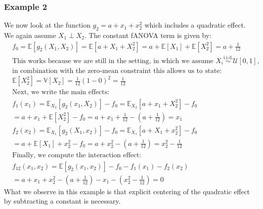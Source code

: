 \subsubsection*{Example 2}
We now look at the function $g_{2} = a + x_1 + x_{2}^2$ which includes a quadratic effect. We again assume $X_1 \perp X_2$. The constant fANOVA term is given by:
\begin{align*}
    &f_0 = \mathbb{E}[g_{2}(X_1, X_2)] = \mathbb{E}[a + X_1 + X_{2}^2] = a + \mathbb{E}[X_1] + \mathbb{E}[X_{2}^2] = a + \frac{1}{12} \\
    &\text{This works because we are still in the setting, in which we assume } X_i \overset{\text{i.i.d.}}{\sim} \mathcal{U}[0, 1], \\
    &\text{in combination with the zero-mean constraint this allows us to state:} \\
    &\mathbb{E}[X_2^2] = \mathbb{V}[X_2] = \frac{1}{12}(1 - 0)^2 = \frac{1}{12} \\
    &\text{Next, we write the main effects:} \\
    &f_1(x_1) = \mathbb{E}_{X_2}[g_{2}(x_1, X_2)] - f_0 = \mathbb{E}_{X_2}[a + x_1 + X_{2}^2] - f_0 \\
    &= a + x_1 + \mathbb{E}[X_{2}^2] - f_0 = a + x_1 + \frac{1}{12} - \left( a + \frac{1}{12} \right) = x_1 \\
    &f_2(x_2) = \mathbb{E}_{X_1}[g_{2}(X_1, x_2)] - f_0 = \mathbb{E}_{X_1}[a + X_1 + x_{2}^2] - f_0 \\
    &= a + \mathbb{E}[X_1] + x_{2}^2 - f_0 = a + x_{2}^2 - \left( a + \frac{1}{12} \right) = x_{2}^2 - \frac{1}{12} \\
    &\text{Finally, we compute the interaction effect:} \\
    &f_{12}(x_1, x_2) = \mathbb{E}[g_{2}(x_1, x_2)] - f_0 - f_1(x_1) - f_2(x_2) \\
    &= a + x_1 + x_{2}^2 - \left( a + \frac{1}{12} \right) - x_1 - \left( x_{2}^2 - \frac{1}{12} \right) = 0
\end{align*}
What we observe in this example is that explicit centering of the quadratic effect by subtracting a constant is necessary.


